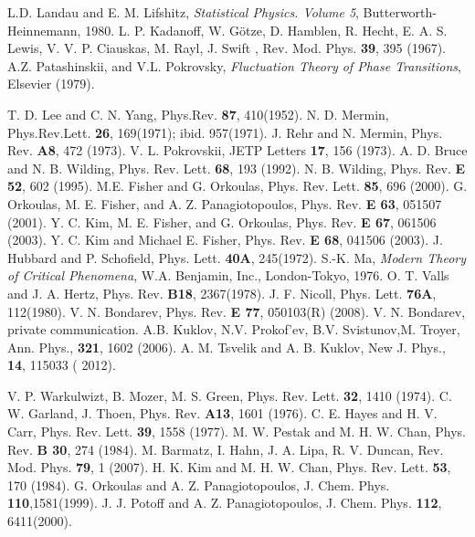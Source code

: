 \documentclass[prb,aps,twocolumn,groupedaddress,floats,showpacs,final]{revtex4}
\begin{document}
\begin{thebibliography}{99}
 L.D. Landau and E. M. Lifshitz, {\it  Statistical Physics. Volume 5}, Butterworth-Heinnemann, 1980.
 L. P.  Kadanoff,  W. G\"otze, D. Hamblen, R. Hecht, E. A. S. Lewis, V. V. P.  Ciauskas, M. Rayl, J. Swift ,
Rev. Mod. Phys. {\bf 39}, 395 (1967).
 A.Z. Patashinskii, and V.L. Pokrovsky, \textit{Fluctuation Theory of Phase Transitions}, Elsevier (1979).


 T. D. Lee and C. N. Yang, Phys.Rev. {\bf 87},  410(1952).
 N. D. Mermin, Phys.Rev.Lett. {\bf 26}, 169(1971); ibid. 957(1971).
 J. Rehr and N. Mermin,  Phys. Rev. {\bf A8}, 472 (1973).
 V. L. Pokrovskii, JETP Letters {\bf 17}, 156 (1973). %
 A. D. Bruce and N. B. Wilding, Phys. Rev. Lett. {\bf 68}, 193 (1992).
 N. B. Wilding, Phys. Rev. {\bf E 52}, 602 (1995).
 M.E. Fisher and G. Orkoulas, Phys. Rev. Lett. {\bf 85}, 696 (2000).
 G. Orkoulas, M. E. Fisher, and A. Z. Panagiotopoulos, Phys. Rev. {\bf E 63}, 051507 (2001).
 Y. C. Kim, M. E. Fisher, and G. Orkoulas,  Phys. Rev. {\bf E 67}, 061506 (2003).
 Y. C. Kim and Michael E. Fisher, Phys. Rev. {\bf E 68}, 041506 (2003).
 J. Hubbard and P. Schofield, Phys. Lett. {\bf 40A}, 245(1972). 
  S.-K. Ma, {\it Modern Theory of Critical Phenomena}, W.A. Benjamin, Inc., London-Tokyo, 1976.
 O. T. Valls and J. A. Hertz, Phys. Rev. {\bf B18}, 2367(1978).
 J. F. Nicoll, Phys. Lett. {\bf 76A}, 112(1980).
 V. N. Bondarev, Phys. Rev. {\bf E 77}, 050103(R) (2008).
 V. N. Bondarev, private communication.
  A.B. Kuklov, N.V. Prokof’ev, B.V. Svistunov,M. Troyer, %
Ann.  Phys., {\bf 321}, 1602 (2006).
 A. M. Tsvelik and A. B. Kuklov,%
 New J. Phys., \textbf{14}, 115033 ( 2012).



V. P. Warkulwizt, B. Mozer, M. S. Green, Phys. Rev. Lett. {\bf 32}, 1410 (1974).
 C. W. Garland, J. Thoen, Phys. Rev. {\bf A13}, 1601 (1976).
 C. E. Hayes and H. V. Carr, Phys. Rev. Lett. {\bf 39}, 1558 (1977). 
 M. W. Pestak and M. H. W. Chan, Phys. Rev. {\bf B 30}, 274 (1984).
 M. Barmatz, I. Hahn, J. A. Lipa, R. V. Duncan, Rev. Mod. Phys. {\bf 79}, 1 (2007).
 H. K. Kim and M. H. W. Chan, Phys. Rev. Lett. {\bf 53}, 170 (1984).
 G. Orkoulas and A. Z. Panagiotopoulos, J. Chem. Phys. {\bf 110},1581(1999).
 J. J. Potoff and A. Z. Panagiotopoulos, J. Chem. Phys. {\bf 112}, 6411(2000).


\end{thebibliography}
\end{document}
